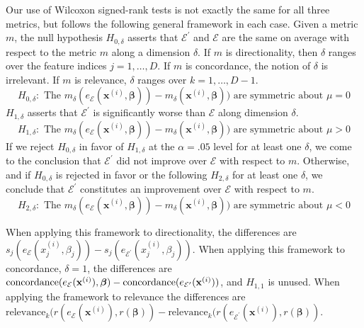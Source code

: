 \documentclass[mnsc,blindrev]{informs3}
\newcommand{\bx}{\mathbf{x}}
\newcommand{\mE}{\mathcal{E}}
\begin{document}
            Our use of Wilcoxon signed-rank tests is not exactly the same for all three metrics, but follows the following general framework in each case.
            Given a metric $m$, the null hypothesis $H_{0,\delta}$ asserts that $\mE^\prime$ and $\mE$ are the same on average with respect to the metric $m$ along a dimension $\delta$. If $m$ is directionality, then $\delta$ ranges over the feature indices $j=1,\ldots,D$. If $m$ is concordance, the notion of $\delta$ is irrelevant. If $m$ is relevance, $\delta$ ranges over $k=1,\ldots,D-1$.
            \begin{equation*}
                H_{0,\delta}: \text{ The } m_\delta(e_\mE(\bx^{(i)},\boldsymbol{\beta})) - m_\delta(\bx^{(i)},\boldsymbol{\beta})) \text{ are symmetric about } \mu = 0
            \end{equation*}
            $H_{1,\delta}$ asserts that $\mE^\prime$ is significantly worse than $\mE$ along dimension $\delta$. 
            \begin{equation*}
                H_{1,\delta}: \text{ The } m_\delta(e_\mE(\bx^{(i)},\boldsymbol{\beta})) - m_\delta(\bx^{(i)},\boldsymbol{\beta})) \text{ are symmetric about } \mu > 0
            \end{equation*}
            If we reject $H_{0,\delta}$ in favor of $H_{1,\delta}$ at the $\alpha=.05$ level for at least one $\delta$, we come to the conclusion that $\mE^{\prime}$ did not improve over $\mE$ with respect to $m$. Otherwise, and if $H_{0,\delta}$ is rejected in favor or the following $H_{2,\delta}$ for at least one $\delta$, we conclude that $\mE^{\prime}$ constitutes an improvement over $\mE$ with respect to $m$.
            \begin{equation*}
                H_{2,\delta}: \text{ The }  m_\delta(e_\mE(\bx^{(i)},\boldsymbol{\beta})) - m_\delta(\bx^{(i)},\boldsymbol{\beta})) \text{ are symmetric about } \mu< 0
            \end{equation*}            
            
            When applying this framework to directionality, the differences are $s_j(e_\mE(x_j^{(i)},\beta_j)) - s_j(e_{\mE^\prime}(x_j^{(i)},\beta_j))$. When applying this framework to concordance, $\delta=1$, the differences are $\text{\text{concordance}}(e_\mE(\mathbf{x}^{(i)}),\boldsymbol{\beta}) - \text{\text{concordance}}(e_{\mE^\prime}(\mathbf{x}^{(i)}))$, and $H_{1,1}$ is unused. When applying the framework to relevance the differences are $\text{relevance}_k(r(e_\mE(\mathbf{x}^{(i)}), r(\boldsymbol{\beta})) - \text{relevance}_k(r(e_{\mE^\prime}(\mathbf{x}^{(i)}), r(\boldsymbol{\beta}))$.
            
\end{document}
